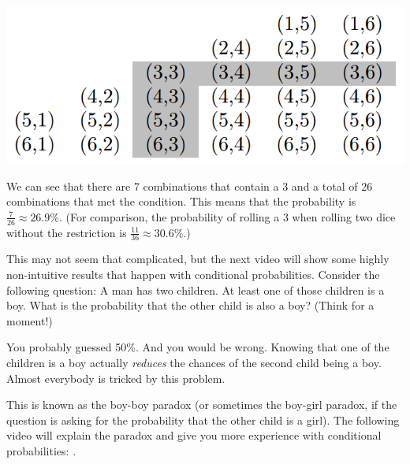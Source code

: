 \documentclass{ximera}
\begin{document}
\begin{image}
\includegraphics{ConditionalProbTable3.png}
\end{image}
We can see that there are 7 combinations that contain a 3 and a total of 26 combinations that met the condition. This means that the probability is $\frac{7}{26} \approx 26.9\%$. (For comparison, the probability of rolling a 3 when rolling two dice without the restriction is $\frac{11}{36} \approx 30.6\%$.)

This may not seem that complicated, but the next video will show some highly non-intuitive results that happen with conditional probabilities. Consider the following question: A man has two children. At least one of those children is a boy. What is the probability that the other child is also a boy? (Think for a moment!)

You probably guessed 50\%. And you would be wrong. Knowing that one of the children is a boy actually \emph{reduces} the chances of the second child being a boy. Almost everybody is tricked by this problem.

This is known as the boy-boy paradox (or sometimes the boy-girl paradox, if the question is asking for the probability that the other child is a girl). The following video will explain the paradox and give you more experience with conditional probabilities: .
\end{document}
